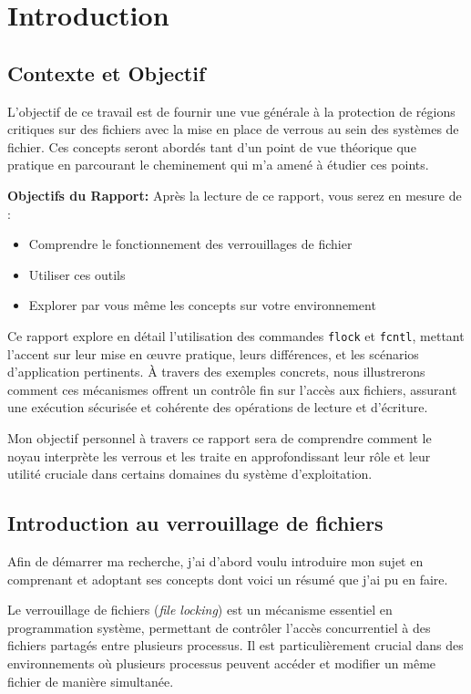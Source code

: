\newpage
\section{Introduction}
\subsection{Contexte et Objectif}

L'objectif de ce travail est de fournir une vue générale à la protection de régions critiques sur des fichiers avec la mise en place de verrous au sein des systèmes de fichier. Ces concepts seront abordés tant d'un point de vue théorique que pratique en parcourant le cheminement qui m'a amené à étudier ces points.

\textbf{Objectifs du Rapport:} Après la lecture de ce rapport, vous serez en mesure de :

\begin{itemize}
\item Comprendre le fonctionnement des verrouillages de fichier
\item Utiliser ces outils 
\item Explorer par vous même les concepts sur votre environnement
\end{itemize}

Ce rapport explore en détail l'utilisation des commandes \texttt{flock} et \texttt{fcntl}, mettant l'accent sur leur mise en œuvre pratique, leurs différences, et les scénarios d'application pertinents. À travers des exemples concrets, nous illustrerons comment ces mécanismes offrent un contrôle fin sur l'accès aux fichiers, assurant une exécution sécurisée et cohérente des opérations de lecture et d'écriture.

Mon objectif personnel à travers ce rapport sera de comprendre comment le noyau interprète les verrous et les traite en approfondissant leur rôle et leur utilité cruciale dans certains domaines du système d'exploitation.


\subsection{Introduction au verrouillage de fichiers}
Afin de démarrer ma recherche, j'ai d'abord voulu introduire mon sujet en comprenant et adoptant ses concepts dont voici un résumé que j'ai pu en faire.

Le verrouillage de fichiers (\textit{file locking}) est un mécanisme essentiel en programmation système, permettant de contrôler l'accès concurrentiel à des fichiers partagés entre plusieurs processus. Il est particulièrement crucial dans des environnements où plusieurs processus peuvent accéder et modifier un même fichier de manière simultanée.

